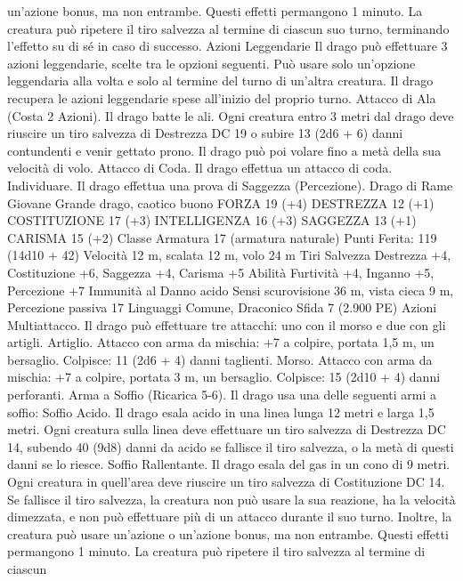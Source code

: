 \begin{multicols}{2}
un’azione bonus, ma non entrambe. Questi effetti permangono 1
minuto. La creatura può ripetere il tiro salvezza al termine di ciascun
suo turno, terminando l’effetto su di sé in caso di successo.
Azioni Leggendarie
Il drago può effettuare 3 azioni leggendarie, scelte tra le opzioni
seguenti. Può usare solo un’opzione leggendaria alla volta e solo
al termine del turno di un’altra creatura. Il drago recupera le
azioni leggendarie spese all’inizio del proprio turno.
Attacco di Ala (Costa 2 Azioni). Il drago batte le ali. Ogni creatura
entro 3 metri dal drago deve riuscire un tiro salvezza di Destrezza
DC 19 o subire 13 (2d6 + 6) danni contundenti e venir gettato prono.
Il drago può poi volare fino a metà della sua velocità di volo.
Attacco di Coda. Il drago effettua un attacco di coda.
Individuare. Il drago effettua una prova di Saggezza (Percezione).
Drago di Rame Giovane
Grande drago, caotico buono
FORZA 19 (+4)
DESTREZZA 12 (+1)
COSTITUZIONE 17 (+3)
INTELLIGENZA 16 (+3)
SAGGEZZA 13 (+1)
CARISMA 15 (+2)
Classe Armatura 17 (armatura naturale)
\hspace*{0pt}\hfill{Punti Ferita}: 119 (14d10 + 42)
Velocità 12 m, scalata 12 m, volo 24 m
Tiri Salvezza Destrezza +4, Costituzione +6, Saggezza +4, Carisma +5
Abilità Furtività +4, Inganno +5, Percezione +7
Immunità al Danno acido
Sensi scurovisione 36 m, vista cieca 9 m, Percezione passiva 17
Linguaggi Comune, Draconico
Sfida 7 (2.900 PE)
Azioni
Multiattacco. Il drago può effettuare tre attacchi: uno con il
morso e due con gli artigli.
Artiglio. Attacco con arma da mischia: +7 a colpire, portata 1,5
m, un bersaglio.
Colpisce: 11 (2d6 + 4) danni taglienti.
Morso. Attacco con arma da mischia: +7 a colpire, portata 3 m,
un bersaglio.
Colpisce: 15 (2d10 + 4) danni perforanti.
Arma a Soffio (Ricarica 5-6). Il drago usa una delle seguenti armi
a soffio:
Soffio Acido. Il drago esala acido in una linea lunga 12 metri e larga
1,5 metri. Ogni creatura sulla linea deve effettuare un tiro salvezza di
Destrezza DC 14, subendo 40 (9d8) danni da acido se fallisce il tiro
salvezza, o la metà di questi danni se lo riesce.
Soffio Rallentante. Il drago esala del gas in un cono di 9 metri. Ogni
creatura in quell’area deve riuscire un tiro salvezza di Costituzione
DC 14. Se fallisce il tiro salvezza, la creatura non può usare la sua
reazione, ha la velocità dimezzata, e non può effettuare più di un
attacco durante il suo turno. Inoltre, la creatura può usare un’azione o
un’azione bonus, ma non entrambe. Questi effetti permangono 1
minuto. La creatura può ripetere il tiro salvezza al termine di ciascun

\end{multicols}
